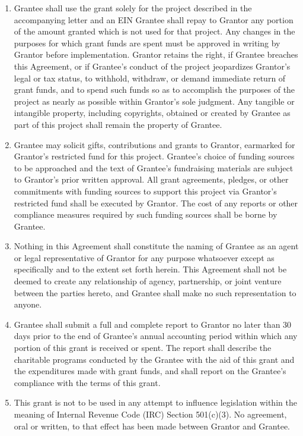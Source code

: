 \documentclass[english,letterpaper,12pt]{article}
\begin{document}
\begin{enumerate}[align=parleft]
\item Grantee shall use the grant solely for the project described in the accompanying letter and an EIN Grantee shall repay to Grantor any portion of the amount granted which is not used for that project.   Any changes in the purposes for which grant funds are spent must be approved in writing by Grantor before implementation.  Grantor retains the right, if Grantee breaches this Agreement, or if Grantee's conduct of the project jeopardizes Grantor's legal or tax status, to withhold, withdraw, or demand immediate return of grant funds, and to spend such funds so as to accomplish the purposes of the project as nearly as possible within Grantor's sole judgment.  Any tangible or intangible property, including copyrights, obtained or created by Grantee as part of this project shall remain the property of Grantee.

\item Grantee may solicit gifts, contributions and grants to Grantor, earmarked for Grantor's restricted fund for this project. Grantee's choice of funding sources to be approached and the text of Grantee's fundraising materials are subject to Grantor's prior written approval. All grant agreements, pledges, or other commitments with funding sources to support this project via Grantor's restricted fund shall be executed by Grantor. The cost of any reports or other compliance measures required by such funding sources shall be borne by Grantee.

\item Nothing in this Agreement shall constitute the naming of Grantee as an agent or legal representative of Grantor for any purpose whatsoever except as specifically and to the extent set forth herein. This Agreement shall not be deemed to create any relationship of agency, partnership, or joint venture between the parties hereto, and Grantee shall make no such representation to anyone. 

\item Grantee shall submit a full and complete report to Grantor no later than 30 days prior to the end of Grantee's annual accounting period within which any portion of this grant is received or spent.  The report shall describe the charitable programs conducted by the Grantee with the aid of this grant and the expenditures made with grant funds, and shall report on the Grantee's compliance with the terms of this grant.

\item This grant is not to be used in any attempt to influence legislation within the meaning of Internal Revenue Code (IRC) Section 501(c)(3). No agreement, oral or written, to that effect has been made between Grantor and Grantee.


\end{enumerate}
\end{document}
